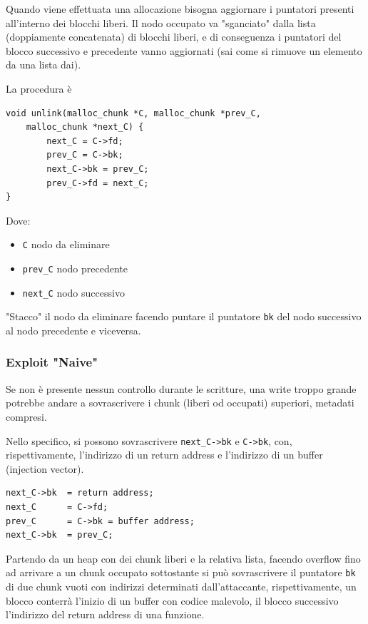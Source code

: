 Quando viene effettuata una allocazione bisogna aggiornare i puntatori presenti all'interno dei blocchi liberi. Il nodo occupato va "sganciato" dalla lista (doppiamente concatenata) di blocchi liberi, e di conseguenza i puntatori del blocco successivo e precedente vanno aggiornati (sai come si rimuove un elemento da una lista dai).

La procedura è
\begin{verbatim}
void unlink(malloc_chunk *C, malloc_chunk *prev_C, 
    malloc_chunk *next_C) {
        next_C = C->fd;
        prev_C = C->bk;
        next_C->bk = prev_C;
        prev_C->fd = next_C;
}
\end{verbatim}

Dove: 
\begin{itemize}
	\item \texttt{C} nodo da eliminare
    
	\item \texttt{prev\_C} nodo precedente
	
    \item \texttt{next\_C} nodo successivo 
\end{itemize}

"Stacco" il nodo da eliminare facendo puntare il puntatore \texttt{bk} del nodo successivo al nodo precedente e viceversa.

\subsubsection{Exploit "Naive"}

Se non è presente nessun controllo durante le scritture, una write troppo grande potrebbe andare a sovrascrivere i chunk (liberi od occupati) superiori, metadati compresi.

Nello specifico, si possono sovrascrivere \texttt{next\_C->bk} e \texttt{C->bk}, con, rispettivamente, l'indirizzo di un return address e l'indirizzo di un buffer (injection vector).
\begin{verbatim}
next_C->bk  = return address;
next_C      = C->fd;
prev_C      = C->bk = buffer address;
next_C->bk  = prev_C;
\end{verbatim}

Partendo da un heap con dei chunk liberi e la relativa lista, facendo overflow fino ad arrivare a un chunk occupato sottostante si può sovrascrivere il puntatore \texttt{bk} di due chunk vuoti con indirizzi determinati dall'attaccante, rispettivamente, un blocco conterrà l'inizio di un buffer con codice malevolo, il blocco successivo l'indirizzo del return address di una funzione.

